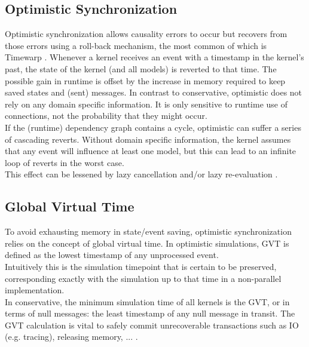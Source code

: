 \subsection{Optimistic Synchronization}
Optimistic synchronization allows causality errors to occur but recovers from those errors using a roll-back mechanism, the most common of which is Timewarp \cite{Jefferson:1985:VT:3916.3988}.
Whenever a kernel receives an event with a timestamp in the kernel's past, the state of the kernel (and all models) is reverted to that time. The possible gain in runtime is offset by the increase in memory required to keep saved states and (sent) messages.
In contrast to conservative, optimistic does not rely on any domain specific information. It is only sensitive to runtime use of connections, not the probability that they might occur. %
\\
If the (runtime) dependency graph contains a cycle, optimistic can suffer a series of cascading reverts. Without domain specific information, the kernel assumes that any event will influence at least one model, but this can lead to an infinite loop of reverts in the worst case.\\
This effect can be lessened by lazy cancellation and/or lazy re-evaluation \cite{FujimotoBook}.
\subsection{Global Virtual Time}
To avoid exhausting memory in state/event saving, optimistic synchronization relies on the concept of global virtual time\cite{Jefferson:1985:VT:3916.3988}. In optimistic simulations, GVT is defined as the lowest timestamp of any unprocessed event. \\ Intuitively this is the simulation timepoint that is certain to be preserved, corresponding exactly with the simulation up to that time in a non-parallel implementation.\\
In conservative, the minimum simulation time of all kernels is the GVT, or in terms of null messages: the least timestamp of any null message in transit.
The GVT calculation is vital to safely commit unrecoverable transactions such as IO (e.g. tracing), releasing memory, ... .

